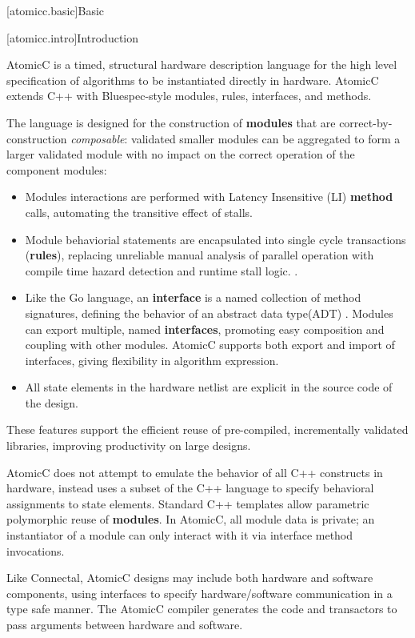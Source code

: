 [atomicc.basic]{Basic}

[atomicc.intro]{Introduction}

AtomicC is a timed, structural hardware description language for
the high level specification of algorithms to be instantiated
directly in hardware.
AtomicC extends C++
with Bluespec-style\cite{Bluespec:www,Hoe:Thesis,HoeArvind:TRS_Synthesis2}
modules, rules, interfaces, and methods.

The language is designed for
the construction of \textbf{modules} that are correct-by-construction \textit{composable}:
validated smaller modules can be aggregated to form
a larger validated module with no impact on the correct
operation of the component modules:
\begin{itemize}
\item Modules interactions are performed with Latency Insensitive (LI)
\cite{carloni2001theory}
\textbf{method} calls, automating the transitive effect of stalls.
\item Module behaviorial statements are encapsulated into single cycle transactions (\textbf{rules}),
replacing unreliable manual analysis of parallel operation
with compile time hazard detection and runtime stall logic.
\cite{NikhilSemantics}
\cite{harris2005composable}.
\item Like the Go language\cite{Pike2012},
an \textbf{interface} is a named collection of method signatures, defining
the behavior of an abstract data type(ADT) \cite{Liskov74programmingwith}.
Modules can export multiple, named \textbf{interfaces},
promoting easy composition and coupling with other modules.
AtomicC supports both export and import of interfaces, giving flexibility in
algorithm expression.
\item All state elements in the hardware
netlist are explicit in the source code of the design.
\end{itemize}
These features support the efficient reuse of pre-compiled, incrementally validated
libraries, improving productivity on large designs.

AtomicC does not attempt to emulate the behavior of all C++ constructs in hardware,
instead uses a subset of the C++ language to specify behavioral
assignments to state elements.
Standard C++ templates allow parametric polymorphic reuse of \textbf{modules}.
In AtomicC, all module data is private; an instantiator of a module can only 
interact with it via interface method invocations.

Like Connectal, AtomicC designs may include both hardware and
software components, using interfaces to specify hardware/software communication
in a type safe manner. The AtomicC compiler generates the code and transactors to pass
arguments between hardware and software.

